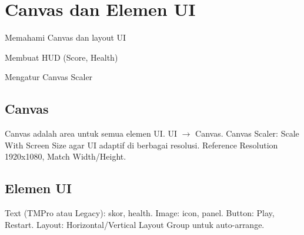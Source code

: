 \section{Canvas dan Elemen UI}

\begin{learningoutcomes}
\item Memahami Canvas dan layout UI
\item Membuat HUD (Score, Health)
\item Mengatur Canvas Scaler
\end{learningoutcomes}

\subsection{Canvas}

Canvas adalah area untuk semua elemen UI. UI $\rightarrow$ Canvas. Canvas Scaler: Scale With Screen Size agar UI adaptif di berbagai resolusi. Reference Resolution 1920x1080, Match Width/Height.

\subsection{Elemen UI}

Text (TMPro atau Legacy): skor, health. Image: icon, panel. Button: Play, Restart. Layout: Horizontal/Vertical Layout Group untuk auto-arrange.
